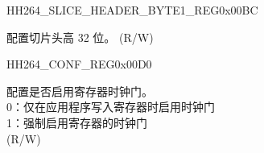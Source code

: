 \begin{register}{H}{H264\_SLICE\_HEADER\_BYTE1\_REG}{0x00BC}\label{regdesc:H264SLICEHEADERBYTE1REG}
%
\regnewline%
\begin{regdesc}\begin{reglist}
\label{fielddesc:H264SLICEBYTEMSB}\item [H264\_SLICE\_BYTE\_MSB] 配置切片头高 32 位。 (R/W)
\end{reglist}\end{regdesc}
\end{register}


\begin{register}{H}{H264\_CONF\_REG}{0x00D0}\label{regdesc:H264CONFREG}
%
%
\regnewline%
\begin{regdesc}\begin{reglist}
\label{fielddesc:H264CLKEN}\item [H264\_CLK\_EN] 配置是否启用寄存器时钟门。\\0：仅在应用程序写入寄存器时启用时钟门\\1：强制启用寄存器的时钟门 \\(R/W)









\end{reglist}\end{regdesc}
\end{register}



